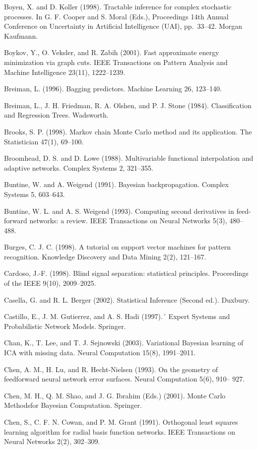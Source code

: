 \documentclass[
  10
]{article}
\begin{document}
Boyen, X. and D. Koller (1998). Tractable inference for complex
stochastic processes. In G. F. Cooper and S. Moral (Eds.), Proceedings
14th Annual Conference on Uncertainty in Artificial Intelligence (UAI),
pp.~33--42. Morgan Kaufmann.

Boykov, Y., O. Veksler, and R. Zabih (2001). Fast approximate energy
minimization via graph cuts. IEEE Transactions on Pattern Analysis and
Machine Intelligence 23(11), 1222--1239.

Breiman, L. (1996). Bagging predictors. Machine Learning 26, 123--140.

Breiman, L., J. H. Friedman, R. A. Olshen, and P. J. Stone (1984).
Classification and Regression Trees. Wadsworth.

Brooks, S. P. (1998). Markov chain Monte Carlo method and its
application. The Statistician 47(1), 69--100.

Broomhead, D. S. and D. Lowe (1988). Multivariable functional
interpolation and adaptive networks. Complex Systems 2, 321--355.

Buntine, W. and A. Weigend (1991). Bayesian backpropagation. Complex
Systems 5, 603--643.

Buntine, W. L. and A. S. Weigend (1993). Computing second derivatives in
feed-forward networks: a review. IEEE Transactions on Neural Networks
5(3), 480--488.

Burges, C. J. C. (1998). A tutorial on support vector machines for
pattern recognition. Knowledge Discovery and Data Mining 2(2), 121--167.

Cardoso, J.-F. (1998). Blind signal separation: statistical principles.
Proceedings of the IEEE 9(10), 2009--2025.

Casella, G. and R. L. Berger (2002). Statistical Inference (Second ed.).
Duxbury.

Castillo, E., J. M. Gutierrez, and A. S. Hadi (1997).´ Expert Systems
and Probabilistic Network Models. Springer.

Chan, K., T. Lee, and T. J. Sejnowski (2003). Variational Bayesian
learning of ICA with missing data. Neural Computation 15(8), 1991--2011.

Chen, A. M., H. Lu, and R. Hecht-Nielsen (1993). On the geometry of
feedforward neural network error surfaces. Neural Computation 5(6),
910-- 927.

Chen, M. H., Q. M. Shao, and J. G. Ibrahim (Eds.) (2001). Monte Carlo
Methodsfor Bayesian Computation. Springer.

Chen, S., C. F. N. Cowan, and P. M. Grant (1991). Orthogonal least
squares learning algorithm for radial basis function networks. IEEE
Transactions on Neural Networks 2(2), 302--309.
\end{document}
